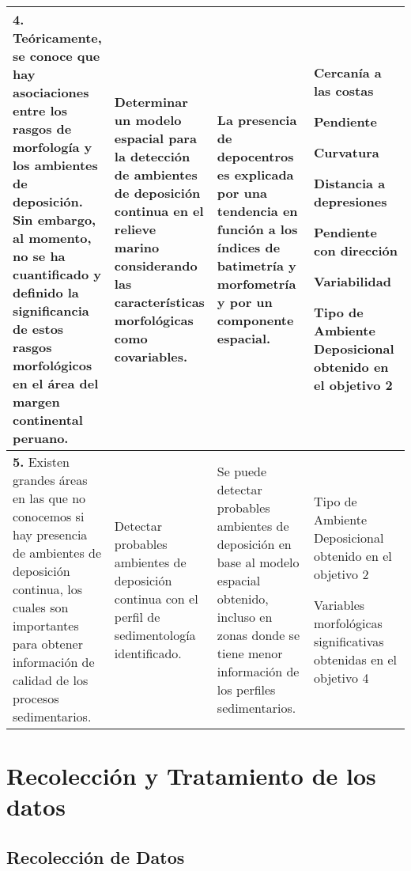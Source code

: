 \begin{table}[H]
\begin{tabular}{ |p{0.25\linewidth}|p{0.25\linewidth}|p{0.25\linewidth}|p{0.25\linewidth}|}
\textbf{4.} Teóricamente, se conoce que hay asociaciones entre los rasgos de morfología y los ambientes de deposición. Sin embargo, al momento, no se ha cuantificado y definido la significancia de estos rasgos morfológicos en el área del margen continental peruano.&Determinar un modelo espacial para la detección de ambientes de deposición continua en el relieve marino considerando las características morfológicas como covariables.  &La presencia de depocentros es explicada por una tendencia en función a los índices de batimetría y morfometría y por un componente espacial.  &
\begin{noindlist}
\item Cercanía a las costas
\item Pendiente
\item Curvatura
\item Distancia a depresiones
\item Pendiente con dirección
\item Variabilidad
\item Tipo de Ambiente Deposicional obtenido en el objetivo 2
\end{noindlist}\\ \hline
\textbf{5.} Existen grandes áreas en las que no conocemos si hay presencia de ambientes de deposición continua, los cuales son importantes para obtener información de calidad de los procesos sedimentarios.&Detectar probables ambientes de deposición continua con el perfil de sedimentología identificado.  &Se puede detectar probables ambientes de deposición en base al modelo espacial obtenido, incluso en zonas donde se tiene menor información de los perfiles sedimentarios.  &
\begin{noindlist}
\item Tipo de Ambiente Deposicional obtenido en el objetivo 2
\item Variables morfológicas significativas obtenidas en el objetivo 4
\end{noindlist}\\ \hline
\end{tabular}
\end{table}

\section{Recolección y Tratamiento de los datos}

\subsection{Recolección de Datos}

